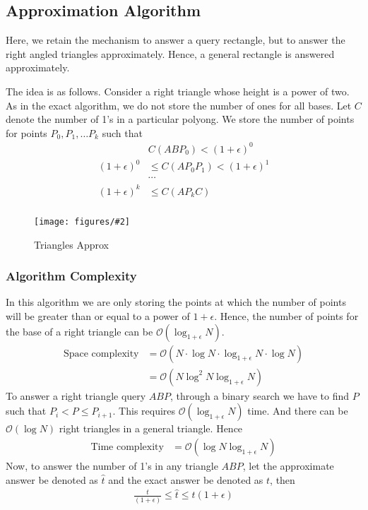 \documentclass{article}
\newcommand{\addpicture}[4]
{ \begin{figure}[H] \centering \texttt{[image: figures/\#2]} \caption{#4} \label{#3}  \end{figure} }
\begin{document}
\subsection{Approximation Algorithm}
Here, we retain the mechanism to answer a query rectangle, but to answer the right angled triangles approximately. Hence, a general rectangle is answered approximately.

The idea is as follows. Consider a right triangle whose height is a power of two. As in the exact algorithm, we do not store the number of ones for all bases. Let $C$ denote the number of 1's in a particular polyong. We store the number of points for points $P_0, P_1, \ldots P_k$ such that
\begin{align*}
& C(ABP_0) < (1+\epsilon)^0 \\
(1+\epsilon)^0 &\le C(AP_0 P_1) < (1+\epsilon)^1 \\
& \cdots \\
(1+\epsilon)^k &\le C(AP_k C) \\
\end{align*}

\addpicture{width=3.5in}{trianglesapprox.png}{trianglesapprox}{Triangles Approx}

\subsubsection{Algorithm Complexity}
In this algorithm we are only storing the points at which the number of points will be greater than or equal to a power of $1 + \epsilon$. Hence, the number of points for the base of a right triangle can be $\mathcal{O}(\log_{1+\epsilon} N)$.
\begin{align*}
\text{Space complexity}&=\mathcal{O}(N \cdot \log N \cdot \log_{1+\epsilon} N \cdot \log N) \\
&= \mathcal{O}(N \log^2 N \log_{1+\epsilon} N)
\end{align*}
To answer a right triangle query $ABP$, through a binary search we have to find $P$ such that $P_i < P \le P_{i+1}$. This requires $\mathcal{O}(\log_{1+\epsilon} N)$ time. And there can be $\mathcal{O}(\log N)$ right triangles in a general triangle. Hence
\begin{align*}
\text{Time complexity}&=\mathcal{O}(\log N \log_{1+\epsilon} N)
\end{align*}
Now, to answer the number of 1's in any triangle $ABP$, let the approximate answer be denoted as $\hat{t}$ and the exact answer be denoted as $t$, then
\begin{align*}
\frac{t}{(1+\epsilon)} \le \hat{t} \le t (1+\epsilon)
\end{align*}
\end{document}
